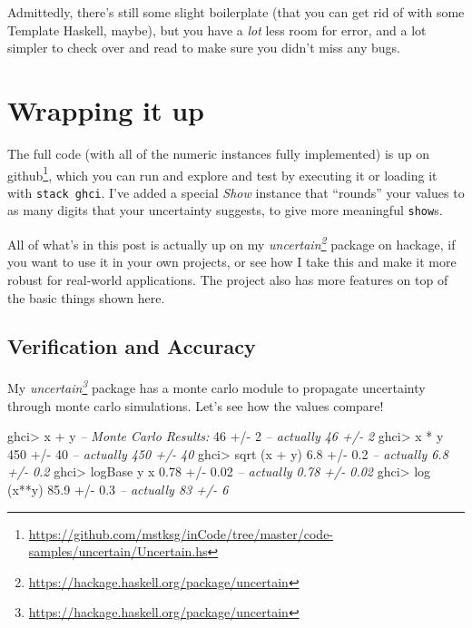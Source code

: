 \documentclass[]{article}
\newenvironment{Shaded}{}{}
\newcommand{\DecValTok}[1]{\textcolor[rgb]{0.25,0.63,0.44}{{#1}}}
\newcommand{\FloatTok}[1]{\textcolor[rgb]{0.25,0.63,0.44}{{#1}}}
\newcommand{\CommentTok}[1]{\textcolor[rgb]{0.38,0.63,0.69}{\textit{{#1}}}}
\newcommand{\FunctionTok}[1]{\textcolor[rgb]{0.02,0.16,0.49}{{#1}}}
\newcommand{\NormalTok}[1]{{#1}}
\renewcommand{\href}[2]{#2\footnote{\url{#1}}}
\begin{document}
Admittedly, there's still some slight boilerplate (that you can get rid
of with some Template Haskell, maybe), but you have a \emph{lot} less
room for error, and a lot simpler to check over and read to make sure
you didn't miss any bugs.

\section{Wrapping it up}\label{wrapping-it-up}

The full code (with all of the numeric instances fully implemented) is
up
\href{https://github.com/mstksg/inCode/tree/master/code-samples/uncertain/Uncertain.hs}{on
github}, which you can run and explore and test by executing it or
loading it with \texttt{stack\ ghci}. I've added a special \emph{Show}
instance that ``rounds'' your values to as many digits that your
uncertainty suggests, to give more meaningful \texttt{show}s.

All of what's in this post is actually up on my
\emph{\href{https://hackage.haskell.org/package/uncertain}{uncertain}}
package on hackage, if you want to use it in your own projects, or see
how I take this and make it more robust for real-world applications. The
project also has more features on top of the basic things shown here.

\subsection{Verification and Accuracy}\label{verification-and-accuracy}

My
\emph{\href{https://hackage.haskell.org/package/uncertain}{uncertain}}
package has a monte carlo module to propagate uncertainty through monte
carlo simulations. Let's see how the values compare!

\begin{Shaded}
\begin{Highlighting}[]
\NormalTok{ghci}\FunctionTok{>} \NormalTok{x }\FunctionTok{+} \NormalTok{y         }\CommentTok{-- Monte Carlo Results:}
\DecValTok{46} \FunctionTok{+/-} \DecValTok{2}            \CommentTok{-- actually 46 +/- 2}
\NormalTok{ghci}\FunctionTok{>} \NormalTok{x }\FunctionTok{*} \NormalTok{y}
\DecValTok{450} \FunctionTok{+/-} \DecValTok{40}          \CommentTok{-- actually 450 +/- 40}
\NormalTok{ghci}\FunctionTok{>} \NormalTok{sqrt (x }\FunctionTok{+} \NormalTok{y)}
\FloatTok{6.8} \FunctionTok{+/-} \FloatTok{0.2}         \CommentTok{-- actually 6.8 +/- 0.2}
\NormalTok{ghci}\FunctionTok{>} \NormalTok{logBase y x}
\FloatTok{0.78} \FunctionTok{+/-} \FloatTok{0.02}       \CommentTok{-- actually 0.78 +/- 0.02}
\NormalTok{ghci}\FunctionTok{>} \NormalTok{log (x}\FunctionTok{**}\NormalTok{y)}
\FloatTok{85.9} \FunctionTok{+/-} \FloatTok{0.3}        \CommentTok{-- actually 83 +/- 6}
\end{Highlighting}
\end{Shaded}
\end{document}
